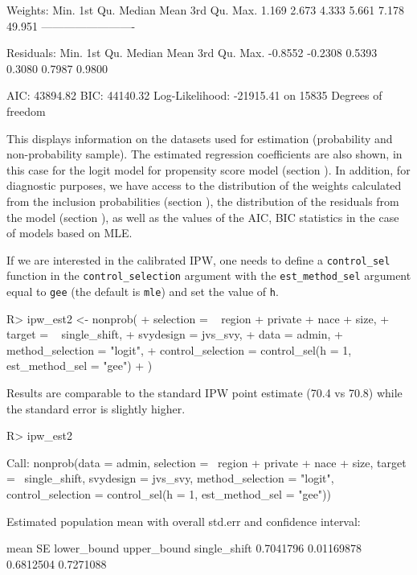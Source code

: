 \documentclass[
]{jss}
\begin{document}
\begin{CodeChunk}
\begin{CodeOutput}
Weights:
   Min. 1st Qu.  Median    Mean 3rd Qu.    Max. 
  1.169   2.673   4.333   5.661   7.178  49.951 
-------------------------

Residuals:
   Min. 1st Qu.  Median    Mean 3rd Qu.    Max. 
-0.8552 -0.2308  0.5393  0.3080  0.7987  0.9800 

AIC: 43894.82
BIC: 44140.32
Log-Likelihood: -21915.41 on 15835 Degrees of freedom
\end{CodeOutput}
\end{CodeChunk}

This displays information on the datasets used for estimation
(probability and non-probability sample). The estimated regression
coefficients are also shown, in this case for the logit model for
propensity score model (section ). In
addition, for diagnostic purposes, we have access to the distribution of
the weights calculated from the inclusion probabilities (section
), the distribution of the residuals from the model
(section ), as well as the values of the AIC, BIC
statistics in the case of models based on MLE.

If we are interested in the calibrated IPW, one needs to define a
\texttt{control\_sel} function in the \texttt{control\_selection}
argument with the \texttt{est\_method\_sel} argument equal to
\texttt{gee} (the default is \texttt{mle}) and set the value of
\texttt{h}.

\begin{CodeChunk}
\begin{CodeInput}
R> ipw_est2 <- nonprob(
+   selection = ~ region + private + nace + size,
+   target = ~ single_shift,
+   svydesign = jvs_svy,
+   data = admin,
+   method_selection = "logit",
+   control_selection = control_sel(h = 1, est_method_sel = "gee")
+ )
\end{CodeInput}
\end{CodeChunk}

Results are comparable to the standard IPW point estimate (70.4 vs 70.8)
while the standard error is slightly higher.

\begin{CodeChunk}
\begin{CodeInput}
R> ipw_est2
\end{CodeInput}
\begin{CodeOutput}

Call:
nonprob(data = admin, selection = ~region + private + nace + 
    size, target = ~single_shift, svydesign = jvs_svy, method_selection = "logit", 
    control_selection = control_sel(h = 1, est_method_sel = "gee"))

Estimated population mean with overall std.err and confidence interval:

                  mean         SE lower_bound upper_bound
single_shift 0.7041796 0.01169878   0.6812504   0.7271088
\end{CodeOutput}
\end{CodeChunk}
\end{document}
